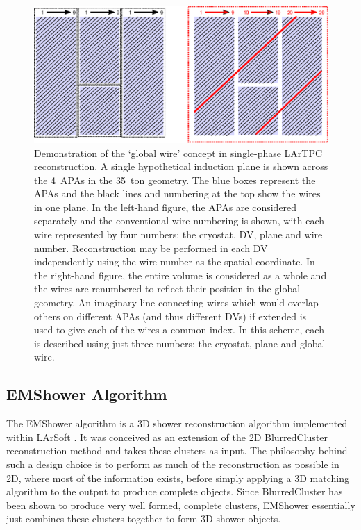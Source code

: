 \begin{figure}
  \centering
  \includegraphics[width=12cm]{GlobalWire.eps}
  \caption[Demonstration of the `global wire' concept in single-phase LArTPC reconstruction.]{Demonstration of the `global wire' concept in single-phase LArTPC reconstruction.  A single hypothetical induction plane is shown across the 4~APAs in the 35~ton geometry.  The blue boxes represent the APAs and the black lines and numbering at the top show the wires in one plane.  In the left-hand figure, the APAs are considered separately and the conventional wire numbering is shown, with each wire represented by four numbers: the cryostat, DV, plane and wire number.  Reconstruction may be performed in each DV independently using the wire number as the spatial coordinate.  In the right-hand figure, the entire volume is considered as a whole and the wires are renumbered to reflect their position in the global geometry.  An imaginary line connecting wires which would overlap others on different APAs (and thus different DVs) if extended is used to give each of the wires a common index.  In this scheme, each is described using just three numbers: the cryostat, plane and global wire.}
  \label{fig:GlobalWire}
\end{figure}

\subsection{EMShower Algorithm}\label{sec:EMShower}

The EMShower algorithm is a 3D shower reconstruction algorithm implemented within LArSoft \cite{EMShower,EMShowerLArSoft}.  It was conceived as an extension of the 2D BlurredCluster reconstruction method and takes these clusters as input.  The philosophy behind such a design choice is to perform as much of the reconstruction as possible in 2D, where most of the information exists, before simply applying a 3D matching algorithm to the output to produce complete objects.  Since BlurredCluster has been shown to produce very well formed, complete clusters, EMShower essentially just combines these clusters together to form 3D shower objects.

